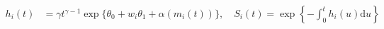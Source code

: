\begin{align}
  h_{i}(t) &= \gamma t^{\gamma - 1} \exp\{\theta_{0} + w_{i}\theta_{1} + \alpha(m_{i}(t))\}, \quad
  S_{i}(t) = \exp\left\{-\int_{0}^{t}h_{i}(u)\text{d}u\right\}
  \label{eqn:submodel-two-hazard-general}
\end{align}